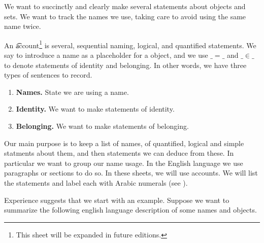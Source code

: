 

We want to succinctly and clearly make several statements about objects and sets. We want to track the names we use, taking care to avoid using the same name twice.


An \t{account}\footnote{This sheet will be expanded in future editions.} is several, sequential naming, logical, and quantified statements.
We say  to introduce a name as a placeholder for a object, and we use $\_=\_$ and $\_\in\_$ to denote statements of identity and belonging.
In other words, we have three types of sentences to record.

\begin{enumerate}

  \item
  \textbf{Names.}
  State we are using a name.

  \item
  \textbf{Identity.}
  We want to make statements of identity.

  \item
  \textbf{Belonging.}
  We want to make statements of belonging.

\end{enumerate}

Our main purpose is to keep a list of names, of quantified, logical and simple statments about them, and then statements we can deduce from these.
In particular we want to group our name usage.
In the English language we use paragraphs or sections to do so.
In these sheets, we will use accounts.
We will list the statements and label each with Arabic numerals (see ).

Experience suggests that we start with an example.
Suppose we want to summarize the following english language description of some names and objects.


